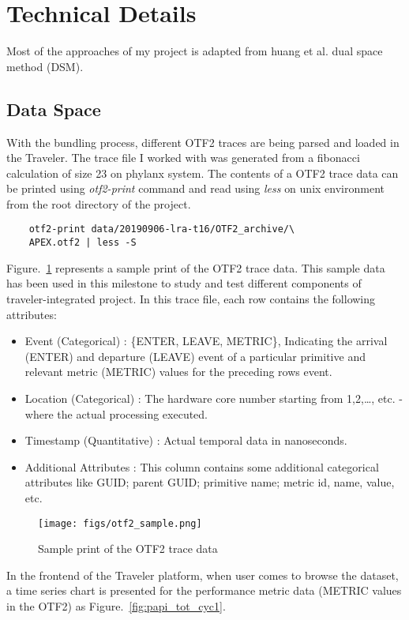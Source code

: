 \section{Technical Details}
\label{sec:technical}
Most of the approaches of my project is adapted from huang et al.\cite{huang2019aideme} dual space method (DSM).
\subsection{Data Space}
With the bundling process, different OTF2 traces are being parsed and loaded in the Traveler. The trace file I worked with was generated from a fibonacci
calculation of size 23 on phylanx system. The contents of a OTF2 trace data can be printed using \emph{otf2-print} command and read using \emph{less}
\cite{kerrisk2010linux} on unix environment from the root directory of the project.
\begin{verbatim}
    otf2-print data/20190906-lra-t16/OTF2_archive/\
    APEX.otf2 | less -S
\end{verbatim}
Figure.~\ref{fig:sample_otf2} represents a sample print of the {OTF2} trace data. This sample data has been used in this milestone to study and test
different components of traveler-integrated project. In this trace file, each row contains the following attributes:
\begin{itemize}
    \item Event (Categorical) : \{{ENTER, LEAVE, METRIC}\}, Indicating the arrival {(ENTER)} and departure {(LEAVE)} event of a particular primitive and
    relevant metric {(METRIC)} values for the preceding rows event.
    \item Location (Categorical) : The hardware core number starting from 1,2,\ldots, etc. - where the actual processing executed.
    \item Timestamp (Quantitative) : Actual temporal data in nanoseconds.
    \item Additional Attributes : This column contains some additional categorical attributes like {GUID}; parent {GUID}; primitive name; metric id, name,
    value, etc.
\end{itemize}
%
\begin{figure}[h]
    \centering
    \texttt{[image: figs/otf2\_sample.png]}
    \caption{Sample print of the {OTF2} trace data}
    \label{fig:sample_otf2}
\end{figure}
%
In the frontend of the Traveler platform, when user comes to browse the dataset, a time series chart is presented for the performance metric data ({METRIC}
values in the OTF2) as Figure.~\ref{fig:papi_tot_cyc1}.


